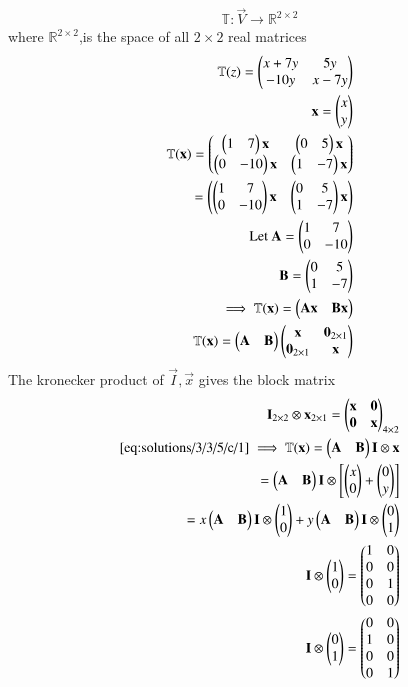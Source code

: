 %

\begin{align}
    \mathbb{T}:\vec{V}\xrightarrow{}\mathbb{R}^{2 \times 2}
\end{align}
where $\mathbb{R}^{2 \times 2}$,is the space of all $2 \times 2$ real matrices\\
\begin{align}
 \mathbb{T}(z)=\myvec{x+7y&5y\\-10y&x-7y}\\
 \vec{x}=\myvec{x\\y}\\
 \mathbb{T}(\vec{x})=\myvec{\myvec{1&7}\vec{x}&\myvec{0&5}\vec{x}\\\myvec{0&-10}\vec{x}&\myvec{1&-7}\vec{x}}\\
 =\myvec{\myvec{1&7\\0&-10}\vec{x}&\myvec{0&5\\1&-7}\vec{x}}\\
 \text{Let } \vec{A}=\myvec{1&7\\0&-10}\\
 \vec{B}=\myvec{0&5\\1&-7}\\
 \implies  \mathbb{T}(\vec{x})=\myvec{\vec{A}\vec{x}&\vec{B}\vec{x}}\\
  \mathbb{T}(\vec{x})=\myvec{\vec{A}&\vec{B}}\myvec{\vec{x}&\vec{0}_{2 \times 1}\\\vec{0}_{2 \times 1}&\vec{x}}\label{eq:solutions/3/3/5/c/1}
\end{align}
The kronecker product of $\vec{I},\vec{x}$ gives the block matrix
\begin{align}
    \vec{I}_{2 \times 2}\otimes \vec{x}_{2\times 1}=\myvec{\vec{x}&\vec{0}\\\vec{0}&\vec{x}}_{4 \times 2}\\
    \eqref{eq:solutions/3/3/5/c/1} \implies  \mathbb{T}(\vec{x})= \myvec{\vec{A}&\vec{B}}\vec{I}\otimes \vec{x}\\
    =\myvec{\vec{A}&\vec{B}}\vec{I}\otimes\left[\myvec{x\\0}+\myvec{0\\y}\right]\\
   =x\myvec{\vec{A}&\vec{B}}  \vec{I}\otimes \myvec{1\\0}+y\myvec{\vec{A}&\vec{B}}  \vec{I}\otimes \myvec{0\\1}\label{eq:solutions/3/3/5/c/2}\\
   \vec{I}\otimes \myvec{1\\0}=\myvec{1&0\\0&0\\0&1\\0&0}\\
   \vec{I}\otimes \myvec{0\\1}=\myvec{0&0\\1&0\\0&0\\0&1}
\end{align}
